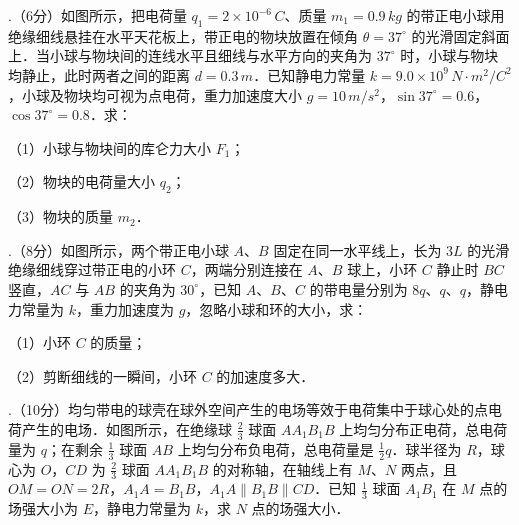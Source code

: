 \documentclass[fontset=none]{ctexart}
\newcommand{\ti}[2]{\par\noindent\hangindent=5.7mm\hangafter=1
  {\fontsize{11.4pt}{17.7pt}\selectfont\heihao{\numboldjian #1}.}\hspace{2.7mm}#2\par}
\newcommand{\fenzhi}[1]{（#1分）}
\newcommand{\optline}[1]{\par\noindent\hangindent=5.7mm\hangafter=0
  {\fontsize{10.5pt}{19pt}\selectfont #1}\par}
\newcommand{\xiexwei}[1]{\par\nobreak\vspace{#1 minus 3mm}}
\newenvironment{juancols}
  {\begin{multicols}{3}\fontsize{10.5pt}{17.7pt}\selectfont}%
  {\end{multicols}}
\begin{document}
\begin{juancols}
  \xiexwei{140mm}
  \begin{ansblock}[测-16]
  \end{ansblock}
  \ti{17}{\fenzhi{6}如图所示，把电荷量 $q_1=2\times10^{-6}\,\unit{C}$、质量 $m_1=0.9\,\unit{kg}$ 的带正电小球用绝缘细线悬挂在水平天花板上，带正电的物块放置在倾角 $\theta=37^\circ$ 的光滑固定斜面上．当小球与物块间的连线水平且细线与水平方向的夹角为 $37^\circ$ 时，小球与物块均静止，此时两者之间的距离 $d=0.3\,\unit{m}$．已知静电力常量 $k=9.0\times10^{9}\,\unit{N\cdot m^2/C^2}$，小球及物块均可视为点电荷，重力加速度大小 $g=10\,\unit{m/s^2}$，$\sin37^\circ=0.6$，$\cos37^\circ=0.8$．求：}
  \optline{（1）小球与物块间的库仑力大小 $F_1$；}
  \optline{（2）物块的电荷量大小 $q_2$；}
  \optline{（3）物块的质量 $m_2$．}
  \xiexwei{130mm}
  \begin{ansblock}[测-17]
  \end{ansblock}
  \ti{18}{\fenzhi{8}如图所示，两个带正电小球 $A$、$B$ 固定在同一水平线上，长为 $3L$ 的光滑绝缘细线穿过带正电的小环 $C$，两端分别连接在 $A$、$B$ 球上，小环 $C$ 静止时 $BC$ 竖直，$AC$ 与 $AB$ 的夹角为 $30^\circ$，已知 $A$、$B$、$C$ 的带电量分别为 $8q$、$q$、$q$，静电力常量为 $k$，重力加速度为 $g$，忽略小球和环的大小，求：}
  \optline{（1）小环 $C$ 的质量；}
  \optline{（2）剪断细线的一瞬间，小环 $C$ 的加速度多大．}
  \xiexwei{150mm}
  \begin{ansblock}[测-18]
  \end{ansblock}
  \ti{19}{\fenzhi{10}均匀带电的球壳在球外空间产生的电场等效于电荷集中于球心处的点电荷产生的电场．如图所示，在绝缘球 $\frac{2}{3}$ 球面 $AA_1B_1B$ 上均匀分布正电荷，总电荷量为 $q$；在剩余 $\frac{1}{3}$ 球面 $AB$ 上均匀分布负电荷，总电荷量是 $\frac{1}{2}q$．球半径为 $R$，球心为 $O$，$CD$ 为 $\frac{2}{3}$ 球面 $AA_1B_1B$ 的对称轴，在轴线上有 $M$、$N$ 两点，且 $OM=ON=2R$，$A_1A=B_1B$，$A_1A\parallel B_1B\parallel CD$．已知 $\frac{1}{3}$ 球面 $A_1B_1$ 在 $M$ 点的场强大小为 $E$，静电力常量为 $k$，求 $N$ 点的场强大小．}
  \xiexwei{100mm}
  \begin{ansblock}[测-19]
  \end{ansblock}
\end{juancols}
\end{document}

